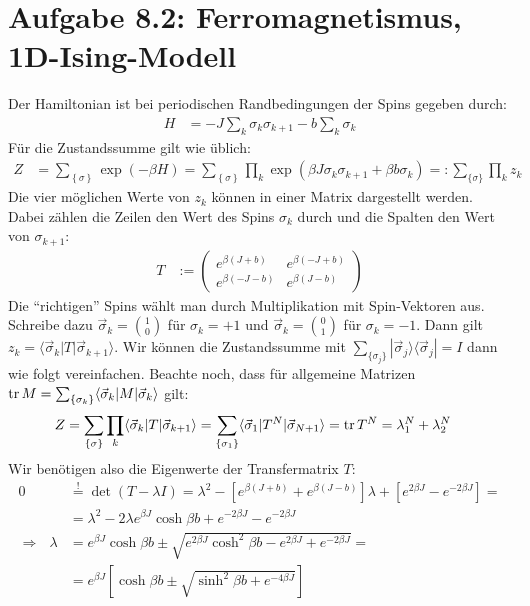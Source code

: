 \documentclass[a4paper,12pt]{article}
\newcommand{\brak}{}
\newcommand{\braket}{}
\newcommand{\kla}{}
\newcommand{\klam}{}
\newcommand{\klammer}{}
\newcommand{\oper}{}
\newcommand{\tecxt}{}
\begin{document}
\section*{Aufgabe 8.2: Ferromagnetismus, 1D-Ising-Modell}
Der Hamiltonian ist bei periodischen Randbedingungen der Spins gegeben durch:
\begin{align*}
H&=-J\sum_k\sigma_k\sigma_{k+1}-b\sum_k\sigma_k
\end{align*}
Für die Zustandssumme gilt wie üblich:
\begin{align*}
Z&=\sum_{\klammer\left\{{\sigma} \right\}}\exp\kla\left( {-\beta H} \right)=\sum_{\klammer\left\{{\sigma} \right\}}\prod_k\exp\kla\left( {\beta J\sigma_k\sigma_{k+1}+\beta b\sigma_k} \right)=:\sum_{\{\sigma\}}\prod_kz_k
\end{align*}
Die vier möglichen Werte von $z_k$ können in einer Matrix dargestellt werden. Dabei zählen die Zeilen den Wert des Spins $\sigma_k$ durch und die Spalten den Wert von $\sigma_{k+1}$:
\begin{align*}
T&:=\begin{pmatrix}
e^{\beta(J+b)}&e^{\beta (-J+b)} \\ e^{\beta(-J-b)}&e^{\beta (J-b)}
\end{pmatrix}
\end{align*}
Die ``richtigen'' Spins wählt man durch Multiplikation mit Spin-Vektoren aus. Schreibe dazu $\vec{\sigma}_k=\binom{1}{0}$ für $\sigma_k=+1$ und $\vec{\sigma}_k=\binom{0}{1}$ für $\sigma_k=-1$. Dann gilt $z_k=\brak\langle {\vec{\sigma}_k}| {T|\vec{\sigma}_{k+1}}\rangle$. Wir können die Zustandssumme mit $\sum_{\{\sigma_j\}}\oper | {\vec{\sigma}_j} \rangle\langle {\vec{\sigma}_j} |=I$ dann wie folgt vereinfachen. Beachte noch, dass für allgemeine Matrizen $\tecxt\text{tr\,}M=\sum_{\{\sigma_k\}}\braket\langle {\vec{\sigma}_k} | {M} | {\vec{\sigma}_{k}}\rangle$ gilt:
\begin{align*}
Z&=\sum_{\{\sigma\}}\prod_k\brak\langle {\vec{\sigma}_k}| {T|\vec{\sigma}_{k+1}}\rangle=\sum_{\{\sigma_1\}}\braket\langle {\vec{\sigma}_1} | {T^N} | {\vec{\sigma}_{N+1}}\rangle=\tecxt\text{tr\,}T^N=\lambda_1^N+\lambda_2^N
\end{align*}
Wir benötigen also die Eigenwerte der Transfermatrix $T$:
\begin{align*}
0&\overset{!}{=}\det\kla\left( {T-\lambda I} \right)=\lambda^2-\klam\left[ {e^{\beta(J+b)}+e^{\beta(J-b)}} \right]\lambda +\klam\left[ {e^{2\beta J}-e^{-2\beta J}} \right]=\\
&=\lambda^2-2\lambda e^{\beta J}\cosh\beta b + e^{-2\beta J}-e^{-2\beta J}\\
\Rightarrow\ \ \ \lambda&=e^{\beta J}\cosh\beta b\pm\sqrt{e^{2\beta J}\cosh^2\beta b-e^{2\beta J}+e^{-2\beta J}}=\\
&=e^{\beta J}\klam\left[ {\cosh\beta b\pm\sqrt{\sinh^2\beta b+e^{-4\beta J}}} \right]
\end{align*}
\end{document}
